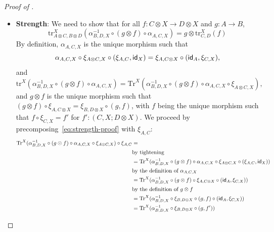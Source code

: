 \begin{proof}[Proof of ]
\begin{itemize}
\[    \text{Tr}^{Y}(\alpha_{B,X,Y}^{-1} \circ f \circ \alpha_{A,X,Y} \circ \xi_{A \otimes X, Y} \circ (\xi_{A,X}, \id_{Y})) = \text{Tr}^{Y}(\alpha_{B,X,Y}^{-1} \circ f \circ \xi_{A,X \otimes Y} \circ (\id_{A}, \xi_{X,Y})).
    \]
    and therefore,
    \[
    \text{tr}^{X \otimes Y}(f) = \text{tr}^{X}(\text{tr}^{Y}(\alpha_{B,X,Y}^{-1} \circ f \circ \alpha_{A,X,Y}))
    \]
    \item \textbf{Strength}: We need to show that for all $f : C \otimes X \to D \otimes X$ and $g : A \to B$,
    \[
    \text{tr}_{A \otimes C,B \otimes D}^{X}(\alpha^{-1}_{B,D,X} \circ (g \otimes f) \circ \alpha_{A,C,X}) = g \otimes \text{tr}_{C,D}^{X}(f)
    \]
    By definition, $\alpha_{A,C,X}$ is the unique morphism such that
    \[
   \alpha_{A,C,X} \circ \xi_{A \otimes C, X} \circ (\xi_{A,C}, \textsf{id}_{X}) = \xi_{A, C \otimes X} \circ (\textsf{id}_{A}, \xi_{C,X}),
    \]
    and
    \begin{equation}\label{eq:strength-proof}
    \text{tr}^{X}(\alpha^{-1}_{B,D,X} \circ (g \otimes f) \circ \alpha_{A,C,X}) = \text{Tr}^{X}(\alpha^{-1}_{B,D,X} \circ (g \otimes f) \circ \alpha_{A,C,X} \circ \xi_{A \otimes C, X}),
    \end{equation}
    and $g \otimes f$ is the unique morphism such that $(g \otimes f) \circ \xi_{A, C \otimes X} = \xi_{B,D \otimes X} \circ (g, f)$,
    with $f$ being the unique morphism such that $f \circ \xi_{C,X} = f'$ for $f' : (C,X; D \otimes X)$.
    We proceed by precomposing~\autoref{eq:strength-proof} with $\xi_{A,C}$:
    \begin{align*}
     \text{Tr}^{X}(\alpha^{-1}_{B,D,X} \circ (g \otimes f) \circ \alpha_{A,C,X} \circ \xi_{A \otimes C, X}) \circ \xi_{A,C} &=\\
     &\text{by tightening}\\
     &= \text{Tr}^{X}(\alpha^{-1}_{B,D,X} \circ (g \otimes f) \circ \alpha_{A,C,X} \circ \xi_{A \otimes C, X} \circ (\xi_{A,C}, \id_{X}))\\
     &\text{by the definition of $\alpha_{A,C,X}$}\\
     &=\text{Tr}^{X}(\alpha^{-1}_{B,D,X} \circ (g \otimes f) \circ \xi_{A, C \otimes X} \circ (\id_{A}, \xi_{C,X}))\\
     &\text{by the definition of $g \otimes f$}\\
     &=\text{Tr}^{X}(\alpha^{-1}_{B,D,X} \circ \xi_{B,D \otimes X} \circ (g , f) \circ (\id_{A}, \xi_{C,X}))\\
     &=\text{Tr}^{X}(\alpha^{-1}_{B,D,X} \circ \xi_{B,D \otimes X} \circ (g , f'))\\

\end{align*}
\end{itemize}
\end{proof}
